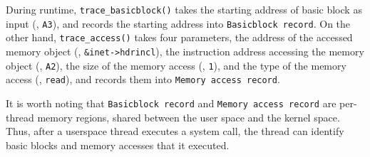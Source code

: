 During runtime, \texttt{trace_basicblock()} takes the starting address
of basic block as input (\ie, \texttt{A3}), and records the starting
address into \texttt{Basicblock record}.
%
On the other hand, \texttt{trace_access()} takes four parameters, the
address of the accessed memory object (\ie, \texttt{\&inet->hdrincl}),
the instruction address accessing the memory object (\ie,
\texttt{A2}), the size of the memory access (\ie, \texttt{1}), and
the type of the memory access (\ie, \texttt{read}), and records them
into \texttt{Memory access record}.






It is worth noting that \texttt{Basicblock record} and \texttt{Memory
  access record} are per-thread memory regions, shared between the
user space and the kernel space. Thus, after a userspace thread
executes a system call, the thread can identify basic blocks and
memory accesses that it executed.










